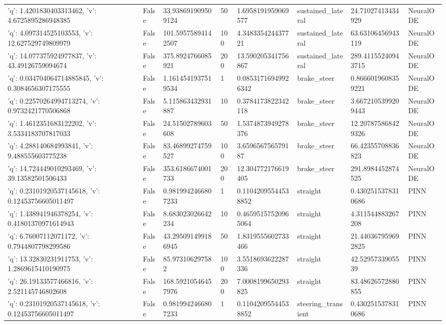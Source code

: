 \begin{tabular}{llllllll}
{'q': 1.4201830403313462, 'v': 4.6725895286948385} & False & 33.938691909509124 & 50 & 1.6958191959069577 & sustained\_lateral & 24.71027413434929 & NeuralODE \\
{'q': 4.097314525103553, 'v': 12.627529749809979} & False & 101.59575894142507 & 100 & 4.348335424437721 & sustained\_lateral & 63.63106456943119 & NeuralODE \\
{'q': 14.077375924977837, 'v': 43.49126759094674} & False & 375.8924766085921 & 200 & 13.590205341756867 & sustained\_lateral & 289.41155240943715 & NeuralODE \\
{'q': 0.034704064714885845, 'v': 0.3084656307175555} & False & 1.1614541937519534 & 1 & 0.08531716949926342 & brake\_steer & 0.8666019608359221 & NeuralODE \\
{'q': 0.22570264994713274, 'v': 0.9732421770506868} & False & 5.115863432931887 & 10 & 0.3784173822342118 & brake\_steer & 3.6672105399209443 & NeuralODE \\
{'q': 1.4612351683122202, 'v': 3.5334183707817033} & False & 24.51502789603608 & 50 & 1.5374873949278376 & brake\_steer & 12.207875868429326 & NeuralODE \\
{'q': 4.288140684993841, 'v': 9.488555603775238} & False & 83.46899274759527 & 100 & 3.659656756579187 & brake\_steer & 66.42355708836823 & NeuralODE \\
{'q': 14.724449010293469, 'v': 39.13582501506433} & False & 353.6186674001733 & 200 & 12.304772176619405 & brake\_steer & 291.8984452874525 & NeuralODE \\
{'q': 0.23101920537145618, 'v': 0.12453756605011497} & False & 0.9819942466807233 & 1 & 0.11042095544538852 & straight & 0.4302515378310686 & PINN \\
{'q': 1.438941946378254, 'v': 0.41801370971614943} & False & 8.683023026642234 & 10 & 0.46595157520965064 & straight & 4.311544883267208 & PINN \\
{'q': 6.76007112071172, 'v': 0.7944807798299586} & False & 43.295091499186945 & 50 & 1.8319555602733466 & straight & 21.440367959692825 & PINN \\
{'q': 13.32830231911753, 'v': 1.2869615410190975} & False & 85.973106297582 & 100 & 3.5518693622287336 & straight & 42.5295733905539 & PINN \\
{'q': 26.19133577466816, 'v': 2.521145746802608} & False & 168.59210546457976 & 200 & 7.0008199650293825 & straight & 83.48626572880855 & PINN \\
{'q': 0.23101920537145618, 'v': 0.12453756605011497} & False & 0.9819942466807233 & 1 & 0.11042095544538852 & steering\_transient & 0.4302515378310686 & PINN \\

\end{tabular}
